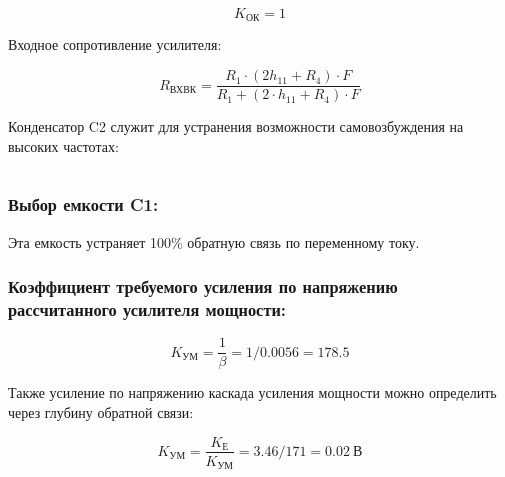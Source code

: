 \begin{equation}
\label{eq:equation4_16}

\end{equation}

\begin{equation}
\label{eq:equation4_17}
K_{\text{ОК}}=1
\end{equation}

Входное сопротивление усилителя:

\begin{equation}
\label{eq:equation4_18}
R_{\text{ВХВК}}=\dfrac{R_1 \cdot (2 h_{11}+R_4) \cdot F}{R_1+(2 \cdot h_{11}+R_{\text{4}}) \cdot F} 
\end{equation}
\begin{equation*}

\end{equation*}

Конденсатор C2 служит для устранения возможности самовозбуждения на высоких частотах:

\begin{equation}
\label{eq:equation4_19}

\end{equation}

\subsubsection{Выбор емкости C1:}

Эта емкость устраняет 100\% обратную связь по переменному току.
\begin{equation}
\label{eq:equation4_20}

\end{equation}

\subsubsection{	Коэффициент требуемого усиления по напряжению рассчитанного усилителя мощности:}

\begin{equation}
\label{eq:equation4_21}
K_{\text{УМ}}=\dfrac{1}{\beta}=1/0.0056=178.5
\end{equation}

Также усиление по напряжению каскада усиления мощности можно определить через глубину обратной связи:

\begin{equation}
\label{eq:equation4_22}
K_{\text{УМ}}=\dfrac {K_{\text{Е}}}{K_{\text{УМ}}}=3.46/171=0.02~\text{В}
\end{equation}

